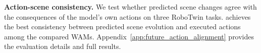 \noindent\textbf{Action-scene consistency.}
We test whether predicted scene changes agree with the consequences of
the model's own actions on three RoboTwin tasks. \method{} achieves the
best consistency between predicted scene evolution and executed actions
among the compared WAMs. Appendix~\ref{app:future_action_alignment}
provides the evaluation details and full results.
